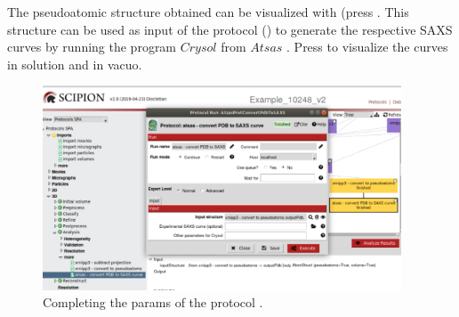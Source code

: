 The pseudoatomic structure obtained can be visualized with \chimera (press . This structure can be used as input of the protocol  () to generate the respective SAXS curves by running the program $Crysol$ from $Atsas$ \citep{svergun1995crysol}. Press  to visualize the curves in solution and in vacuo.

\begin{figure}[H]
  \centering
  \captionsetup{width=.8\linewidth} 
  \includegraphics[width=0.95\textwidth]
  {images/atsas_convert_PDB_to_SAXS.pdf}
  \caption{Completing the params of the protocol .}
  \label{fig:atsas_convert_PDB_to_SAXS}
  \end{figure}


